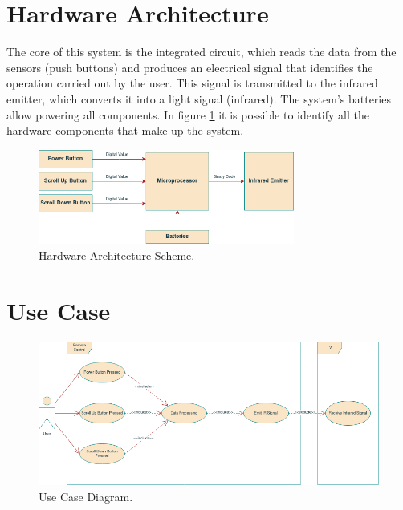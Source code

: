 \documentclass[12pt, letterpaper]{report}
\begin{document}

\section{Hardware Architecture}
The core of this system is the integrated circuit, which reads the data from the sensors (push buttons) and produces an electrical signal that identifies the operation carried out by the user. This signal is transmitted to the infrared emitter, which converts it into a light signal (infrared). The system's batteries allow powering all components. In figure \ref{fig:hw_arch} it is possible to identify all the hardware components that make up the system. 

\begin{figure}[ht]
	\centering
	\includegraphics[width=0.75\textwidth]{HW_Arch}
	\caption{Hardware Architecture Scheme.}
	\label{fig:hw_arch}
\end{figure}


\section{Use Case}

\begin{figure}[ht]
	\centering
	\includegraphics[width=1.2\textwidth]{Use-Case}
	\caption{Use Case Diagram.}
	\label{fig:use_case}
\end{figure}
\end{document}

